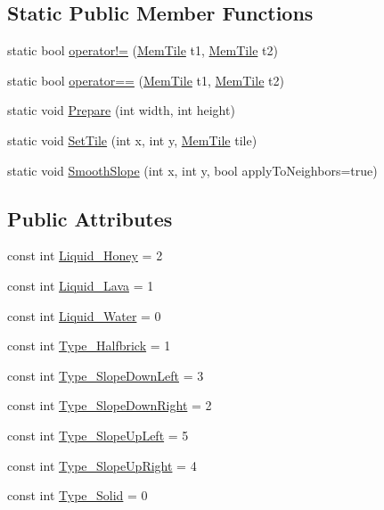 \subsection*{Static Public Member Functions}
\begin{DoxyCompactItemize}
\item 
static bool \hyperlink{classOTA_1_1Memory_1_1MemTile_a3d5834a28f3a54b4f0c3532965d850d4}{operator!=} (\hyperlink{classOTA_1_1Memory_1_1MemTile}{Mem\+Tile} t1, \hyperlink{classOTA_1_1Memory_1_1MemTile}{Mem\+Tile} t2)
\item 
static bool \hyperlink{classOTA_1_1Memory_1_1MemTile_a42fb01681baf4f5994e9a9ef4cd856e1}{operator==} (\hyperlink{classOTA_1_1Memory_1_1MemTile}{Mem\+Tile} t1, \hyperlink{classOTA_1_1Memory_1_1MemTile}{Mem\+Tile} t2)
\item 
static void \hyperlink{classOTA_1_1Memory_1_1MemTile_a8185aa789f6db71814a6398bbb03ba91}{Prepare} (int width, int height)
\item 
static void \hyperlink{classOTA_1_1Memory_1_1MemTile_a883c4772c5b9182cfef6916eae6efdf1}{Set\+Tile} (int x, int y, \hyperlink{classOTA_1_1Memory_1_1MemTile}{Mem\+Tile} tile)
\item 
static void \hyperlink{classOTA_1_1Memory_1_1MemTile_a94a617ad9f1b3fa35ea76fa00d7e11f4}{Smooth\+Slope} (int x, int y, bool apply\+To\+Neighbors=true)
\end{DoxyCompactItemize}
\subsection*{Public Attributes}
\begin{DoxyCompactItemize}
\item 
const int \hyperlink{classOTA_1_1Memory_1_1MemTile_a4b3da666c8ea7373f12a70437b127c93}{Liquid\+\_\+\+Honey} = 2
\item 
const int \hyperlink{classOTA_1_1Memory_1_1MemTile_a8204371fbd3d517fd8e9fd3a854df5a6}{Liquid\+\_\+\+Lava} = 1
\item 
const int \hyperlink{classOTA_1_1Memory_1_1MemTile_aa03d5c2e8b0d75c3762a0ba64e266ba8}{Liquid\+\_\+\+Water} = 0
\item 
const int \hyperlink{classOTA_1_1Memory_1_1MemTile_a956954f04a20bbc8754eb17b366f9c35}{Type\+\_\+\+Halfbrick} = 1
\item 
const int \hyperlink{classOTA_1_1Memory_1_1MemTile_a97d1c115d79ec8e4d3f3759a0296f8e5}{Type\+\_\+\+Slope\+Down\+Left} = 3
\item 
const int \hyperlink{classOTA_1_1Memory_1_1MemTile_aaca1aa3fcb2bd8e57ddfe499d0758270}{Type\+\_\+\+Slope\+Down\+Right} = 2
\item 
const int \hyperlink{classOTA_1_1Memory_1_1MemTile_a958e2d5f8731d2a6d0c2b0a512936dd6}{Type\+\_\+\+Slope\+Up\+Left} = 5
\item 
const int \hyperlink{classOTA_1_1Memory_1_1MemTile_aa1779b69ff3bdaa0543c97ead7d2360d}{Type\+\_\+\+Slope\+Up\+Right} = 4
\item 
const int \hyperlink{classOTA_1_1Memory_1_1MemTile_a1ab0d8b91411eea677e76eb241db382b}{Type\+\_\+\+Solid} = 0
\end{DoxyCompactItemize}
